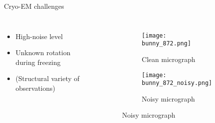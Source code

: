 \begin{frame}[c]{Cryo-EM challenges}
    \begin{columns}[c]
        
        \begin{itemize}
            \item High-noise level 
            \item Unknown rotation during freezing
            \item (Structural variety of observations)
        \end{itemize}


        \begin{figure}
            \centering
            \begin{subfigure}[t]{0.5\textwidth}
                \texttt{[image: bunny\_872.png]}
                \caption{Clean micrograph}
            \end{subfigure}\hfill                
            \begin{subfigure}[t]{0.5\textwidth}
                \texttt{[image: bunny\_872\_noisy.png]}
                \caption{Noisy micrograph}
            \end{subfigure}\hfill                
        \end{figure}

    \end{columns}

\end{frame}

